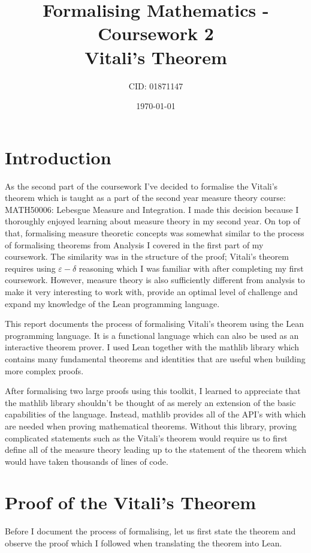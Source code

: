 \documentclass[11pt]{article}
\begin{document}
\title{Formalising Mathematics - Coursework 2 \\ Vitali's Theorem}
\date{\today}
\author{CID: 01871147}
\maketitle

\section*{Introduction}

As the second part of the coursework I've decided to formalise the Vitali's theorem
which is taught as a part of the second year measure theory course: MATH50006:
Lebesgue Measure and Integration. I made this decision because I thoroughly enjoyed
learning about measure theory in my second year. On top of that, formalising measure
theoretic concepts was somewhat similar to the process of formalising theorems
from Analysis I covered in the first part of my coursework.
The similarity was in the structure of the proof; Vitali's theorem requires using
$\varepsilon-\delta$ reasoning which I was familiar with after completing my first
coursework. However, measure theory is also sufficiently different from analysis
to make it very interesting to work with, provide an optimal level of challenge
and expand my knowledge of the Lean programming language.

This report documents the process of formalising Vitali's theorem using the Lean
programming language. It is a functional language which can also be used as an interactive
theorem prover. I used Lean together with the mathlib library which contains many
fundamental theorems and identities that are useful when building more complex proofs.

After formalising two large proofs using this toolkit, I learned to appreciate that
the mathlib library shouldn't be thought of as merely an extension of the basic
capabilities of the language. Instead, mathlib provides all of the API's with which
are needed when proving mathematical theorems. Without this library,
proving complicated statements such as the Vitali's theorem would require us to
first define all of the measure theory leading up to the statement of the theorem
which would have taken thousands of lines of code.

\section*{Proof of the Vitali's Theorem}
Before I document the process of formalising, let us first state the
theorem and observe the proof which I followed when translating the theorem
into Lean.
\end{document}

